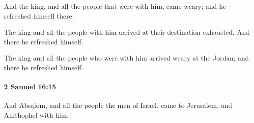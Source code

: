 			\begin{versebox}
					\item[BHS] 
					\item[ASV] And the king, and all the people that were with him, came weary; and he refreshed himself there.
					\item[NIV] The king and all the people with him arrived at their destination exhausted. And there he refreshed himself.
					\item[NRSV] The king and all the people who were with him arrived weary at the Jordan; and there he refreshed himself.
			\end{versebox}

		\paragraph{2 Samuel 16:15} %
			\label{2SAMUEL-16-15}

			And Absalom, and all the people the men of Israel, came to Jerusalem, and Ahithophel with him.


